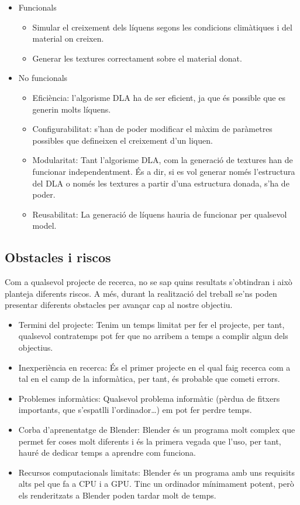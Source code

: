 \documentclass{article}
\begin{document}
\begin{itemize}
    \item Funcionals
    \begin{itemize}
        \item Simular el creixement dels líquens segons les condicions climàtiques i del material on creixen.
        \item Generar les textures correctament sobre el material donat.
    \end{itemize}
    \item No funcionals
    \begin{itemize}
        \item Eficiència: l'algorisme DLA ha de ser eficient, ja que és possible que es generin molts líquens.
        \item Configurabilitat: s'han de poder modificar el màxim de paràmetres possibles que defineixen el creixement d'un liquen.
        \item Modularitat: Tant l'algorisme DLA, com la generació de textures han de funcionar independentment. És a dir, si es vol generar només l'estructura del DLA o només les textures a partir d'una estructura donada, s'ha de poder.
        \item Reusabilitat: La generació de líquens hauria de funcionar per qualsevol model.
    \end{itemize}
\end{itemize}

\subsection{Obstacles i riscos}

Com a qualsevol projecte de recerca, no se sap quins resultats s'obtindran i això planteja diferents riscos. A més, durant la realització del treball se'ns poden presentar diferents obstacles per avançar cap al nostre objectiu.

\begin{itemize}
    \item Termini del projecte: Tenim un temps limitat per fer el projecte, per tant, qualsevol contratemps pot fer que no arribem a temps a complir algun dels objectius.
    \item Inexperiència en recerca: És el primer projecte en el qual faig recerca com a tal en el camp de la informàtica, per tant, és probable que cometi errors.
    \item Problemes informàtics: Qualsevol problema informàtic (pèrdua de fitxers importants, que s'espatlli l'ordinador…) em pot fer perdre temps.
    \item Corba d'aprenentatge de Blender: Blender és un programa molt complex que permet fer coses molt diferents i és la primera vegada que l'uso, per tant, hauré de dedicar temps a aprendre com funciona.
    \item Recursos computacionals limitats: Blender és un programa amb uns requisits alts pel que fa a CPU i a GPU. Tinc un ordinador mínimament potent, però els renderitzats a Blender poden tardar molt de temps.
\end{itemize}
\end{document}
